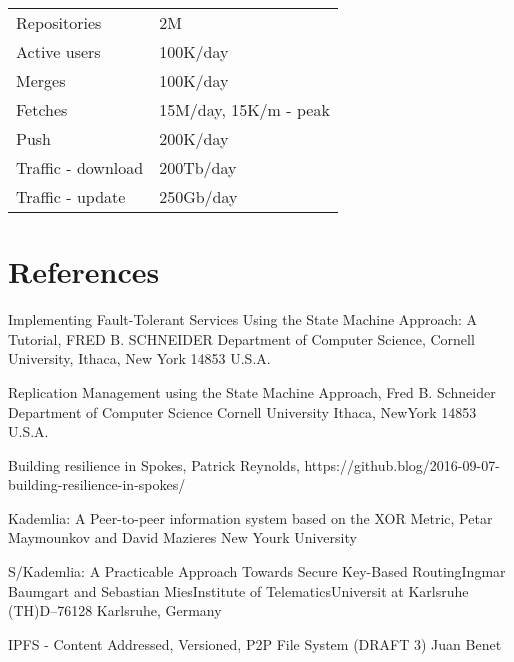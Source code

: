 \documentclass[nonacm=true]{acmart}
\begin{document}
\begin{tabular}{ll}
  Repositories & 2M \\
  Active users & 100K/day \\
  Merges & 100K/day \\
  Fetches & 15M/day, 15K/m - peak \\
  Push & 200K/day \\
  Traffic - download & 200Tb/day \\
  Traffic - update & 250Gb/day \\
\end{tabular}

% 

\section{References}
\label{ref:references}

Implementing Fault-Tolerant Services Using the State Machine Approach: A Tutorial, FRED B. SCHNEIDER Department of Computer Science, Cornell University, Ithaca, New York 14853 U.S.A.

Replication Management using the State Machine Approach, Fred B. Schneider Department of Computer Science Cornell University Ithaca, NewYork 14853 U.S.A.

Building resilience in Spokes, Patrick Reynolds, https://github.blog/2016-09-07-building-resilience-in-spokes/

Kademlia: A Peer-to-peer information system based on the XOR Metric, Petar Maymounkov and David Mazieres New Yourk University

S/Kademlia: A Practicable Approach Towards Secure Key-Based RoutingIngmar Baumgart and Sebastian MiesInstitute of TelematicsUniversit at Karlsruhe (TH)D–76128 Karlsruhe, Germany

IPFS - Content Addressed, Versioned, P2P File System (DRAFT 3) Juan Benet

\end{document}
